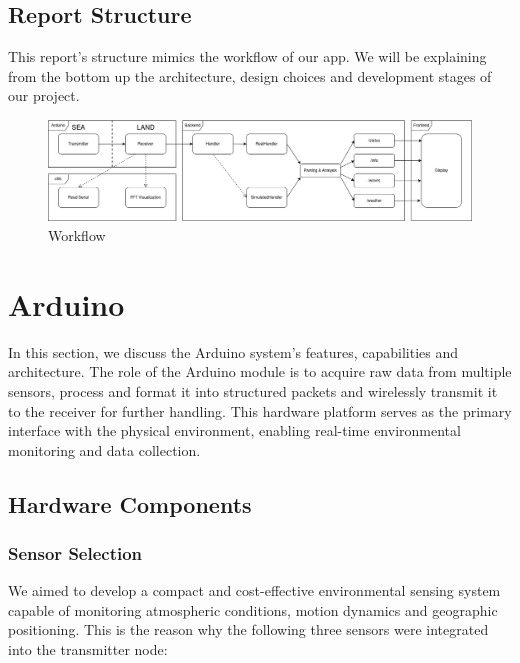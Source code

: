 \documentclass{article}
\begin{document}
    \subsection{Report Structure}
    This report's structure mimics the workflow of our app. We will be explaining from the bottom up the architecture, design choices and development stages of our project.

    \begin{figure} [h]
        \centering
        \includegraphics[width=1\linewidth]{assets/workflow.png}
        \caption{Workflow}
        \label{fig:enter-label}
    \end{figure}

\newpage
\section{Arduino}
In this section, we discuss the Arduino system’s features, capabilities and architecture. The role of the Arduino module is to acquire raw data from multiple sensors, process and format it into structured packets and wirelessly transmit it to the receiver for further handling. This hardware platform serves as the primary interface with the physical environment, enabling real-time environmental monitoring and data collection.
\subsection{Hardware Components}
    \subsubsection{Sensor Selection}
    We aimed to develop a compact and cost-effective environmental sensing system capable of monitoring atmospheric conditions, motion dynamics and geographic positioning. This is the reason why the following three sensors were integrated into the transmitter node:
    
\end{document}
